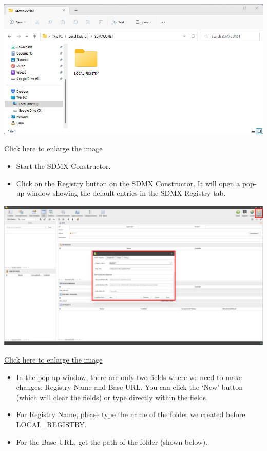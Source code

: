 \documentclass[
]{book}
\providecommand{\tightlist}{%
  \setlength{\itemsep}{0pt}\setlength{\parskip}{0pt}}
\begin{document}
\begin{center}\includegraphics[width=1\linewidth]{./images/image048} \end{center}

\href{images/image048.png}{Click here to enlarge the image}

\begin{itemize}
\tightlist
\item
  Start the SDMX Constructor.
\item
  Click on the Registry button on the SDMX Constructor. It will open a pop-up window showing the default entries in the SDMX Registry tab.
\end{itemize}

\begin{center}\includegraphics[width=1\linewidth]{./images/image050} \end{center}

\href{images/image050.png}{Click here to enlarge the image}

\begin{itemize}
\tightlist
\item
  In the pop-up window, there are only two fields where we need to make changes: Registry Name and Base URL. You can click the `New' button (which will clear the fields) or type directly within the fields.
\item
  For Registry Name, please type the name of the folder we created before LOCAL\_REGISTRY.
\item
  For the Base URL, get the path of the folder (shown below).
\end{itemize}
\end{document}

